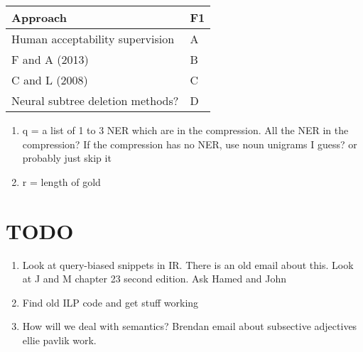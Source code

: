 \documentclass[11pt,a4paper]{article}
\begin{document}
\begin{table}[htb!]
\begin{tabular}{ll}
\centering
Approach & F1 \\ \hline
Human acceptability supervision         &  A          \\
F and A (2013)    & B           \\
C and L (2008)    & C        \\
Neural subtree deletion methods? &  D    \\   
\end{tabular}
\end{table}

\begin{enumerate}
\item{q = a list of 1 to 3 NER which are in the compression. All the NER in the compression? If the compression has no NER, use noun unigrams I guess? or probably just skip it}
\item{r = length of gold}
\end{enumerate}


\section{TODO}
\begin{enumerate}
\item{Look at query-biased snippets in IR. There is an old email about this. Look at J and M chapter 23 second edition. Ask Hamed and John}
\item{Find old ILP code and get stuff working}
\item{How will we deal with semantics? Brendan email about subsective adjectives ellie pavlik work. }
\end{enumerate}
\end{document}
